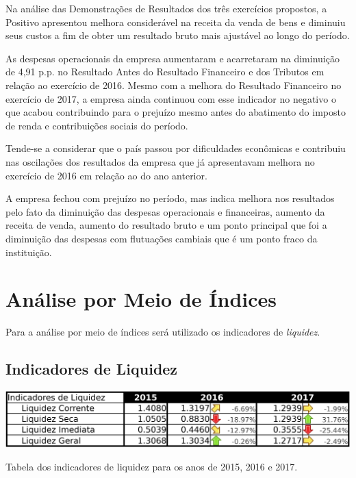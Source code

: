 Na análise das Demonstrações de Resultados dos três exercícios propostos, a Positivo apresentou melhora considerável na receita da venda de bens e diminuiu seus custos a fim de obter um resultado bruto mais ajustável ao longo do período. 

As despesas operacionais da empresa aumentaram e acarretaram na diminuição de 4,91 p.p. no Resultado Antes do Resultado Financeiro e dos Tributos em relação ao exercício de 2016. Mesmo com a melhora do Resultado Financeiro no exercício de 2017, a empresa ainda continuou com esse indicador no negativo o que acabou contribuindo para o prejuízo mesmo antes do abatimento do imposto de renda e contribuições sociais do período.

Tende-se a considerar que o país passou por dificuldades econômicas e contribuiu nas oscilações dos resultados da empresa que já apresentavam melhora no exercício de 2016 em relação ao do ano anterior.

A empresa fechou com prejuízo no período, mas indica melhora nos resultados pelo fato da diminuição das despesas operacionais e financeiras, aumento da receita de venda, aumento do resultado bruto e um ponto principal que foi a diminuição das despesas com flutuações cambiais que é um ponto fraco da instituição.

\section{Análise por Meio de Índices}
\label{sec:analiseIndices}

Para a análise por meio de índices será utilizado os indicadores de \emph{liquidez}.

\subsection{Indicadores de Liquidez}

\begin{table}[h]
\begin{centering}
\includegraphics[width=1.0\textwidth]{Img/IndicadorLiquidez}
\caption{\label{tab:indicadorLiquidez}Tabela dos indicadores de liquidez para os anos de 2015, 2016 e 2017.}
\par\end{centering}
\end{table}


